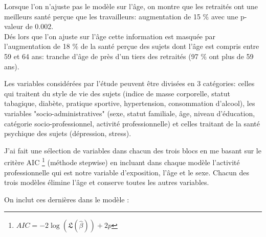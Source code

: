 \documentclass{book}
\begin{document}
\begin{longtable}{lccc|ccc}
 
    \hline
    \end{longtable} 

\noindent
Lorsque l'on n'ajuste pas le modèle sur l'âge, on montre que les retraités ont une meilleurs santé perçue que les travailleurs: augmentation de 15 $\%$ avec une p-valeur de 0.002.\\
Dés lors que l'on ajuste sur l'âge cette information est masquée par l'augmentation de 18 $\%$ de la santé perçue des sujets dont l'âge est compris entre 59 et 64 ans: tranche d'âge de près d'un tiers des retraités (97 $\%$ ont plus de 59 ans).

\bigskip

\noindent
Les variables considérées par l'étude peuvent être divisées en 3 catégories: celles qui traitent du style de vie des sujets (indice de masse corporelle, statut tabagique, diabète, pratique sportive, hypertension, consommation d'alcool), les variables "socio-administratives" (sexe, statut familiale, âge, niveau d'éducation, catégorie socio-professionnel, activité professionnelle) et celles traitant de la santé psychique des sujets (dépression, stress).

\bigskip

\noindent
J'ai fait une sélection de variables dans chacun des trois blocs en me basant sur le critère AIC \footnote{$AIC = -2 \log \left( \mathfrak{L} (\hat{\beta}) \right) + 2p $} (méthode stepwise) en incluant dans chaque modèle l'activité professionnelle qui est notre variable d'exposition, l'âge et le sexe. Chacun des trois modèles élimine l'âge et conserve toutes les autres variables.

\bigskip

\noindent
On inclut ces dernières dans le modèle :

\newpage
\end{document}
